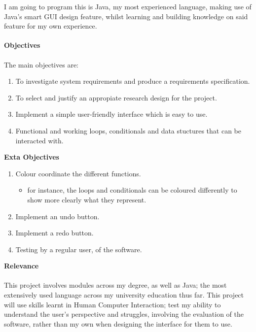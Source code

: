 \documentclass[a4paper, 12pt]{article}
\begin{document}
            I am going to program this is Java, my most experienced language, making use of Java's
            smart GUI design feature, whilst learning and building knowledge on said feature for my
            own experience. \\\\
            \textbf{Objectives} \\\\
            The main objectives are:
            \begin{enumerate}
                \item To investigate system requirements and produce a requirements specification.
                \item To select and justify an appropiate research design for the project.
                \item Implement a simple user-friendly interface which is easy to use.
                \item Functional and working loops, conditionals and data stuctures that can be interacted
                with. \\
            \end{enumerate}        
            \textbf{Exta Objectives}
            \begin{enumerate}
                \item Colour coordinate the different functions.
                \begin{itemize}
                    \item for instance, the loops and conditionals can be coloured differently to show more
                    clearly what they represent.
                \end{itemize}
                \item Implement an undo button.
                \item Implement a redo button.
                \item Testing by a regular user, of the software.
            \end{enumerate}
            \textbf{Relevance} \\\\
            This project involves modules across my degree, as well as Java; the most extensively
            used language across my university education thus far. This project will use skills learnt
            in Human Computer Interaction; test my ability to understand the user's perspective and
            struggles, involving the evaluation of the software, rather than my own when designing
            the interface for them to use.
        
\end{document}
